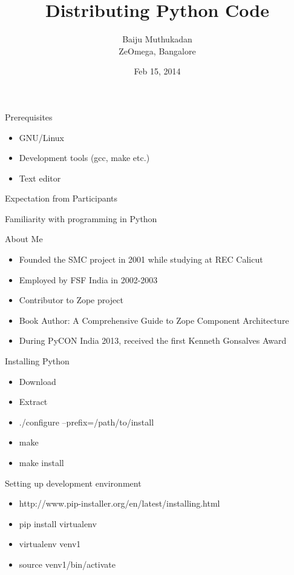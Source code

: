 \documentclass[12pt,handout]{beamer}
\title[Distributing Python Code]{Distributing Python Code}
\author{Baiju Muthukadan \\ ZeOmega, Bangalore}
\date{Feb 15, 2014}
\begin{document}
\begin{frame}
\titlepage
\end{frame}


\begin{frame}{Prerequisites}
\begin{itemize}
\item GNU/Linux
\item Development tools (gcc, make etc.)
\item Text editor
\end{itemize}
\end{frame}

\begin{frame}{Expectation from Participants}

\center \Large{Familiarity with programming in Python}

\end{frame}

\begin{frame}{About Me}

\begin{itemize}
\item Founded the SMC project in 2001 while studying at REC Calicut
\item Employed by FSF India in 2002-2003
\item Contributor to Zope project
\item Book Author: A Comprehensive Guide to Zope Component Architecture
\item During PyCON India 2013, received the first Kenneth Gonsalves Award
\end{itemize}

\end{frame}

\begin{frame}{Installing Python}

\begin{itemize}

\item Download
\item Extract
\item ./configure --prefix=/path/to/install
\item make
\item make install

\end{itemize}
\end{frame}


\begin{frame}{Setting up development environment}

\begin{itemize}

\item http://www.pip-installer.org/en/latest/installing.html
\item pip install virtualenv
\item virtualenv venv1
\item source venv1/bin/activate

\end{itemize}
\end{frame}
\end{document}
